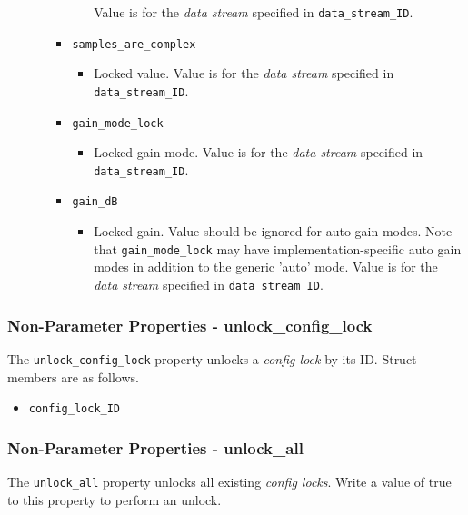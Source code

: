 \documentclass{article}
\begin{document}
\begin{itemize}
\begin{itemize}
\begin{itemize}
\begin{itemize}
                  Value is for the \textit{data stream} specified in
                  \verb+data_stream_ID+.
              \end{itemize}
            \item \verb+samples_are_complex+
              \begin{itemize}
                \item Locked value.
                  Value is for the \textit{data stream} specified in
                  \verb+data_stream_ID+.
              \end{itemize}
            \item \verb+gain_mode_lock+
              \begin{itemize}
                \item Locked gain mode.
                  Value is for the \textit{data stream} specified in
                  \verb+data_stream_ID+.
              \end{itemize}
            \item \verb+gain_dB+
              \begin{itemize}
                \item Locked gain. Value should be ignored for auto gain modes.
                  Note that \verb+gain_mode_lock+ may have implementation-specific
                  auto gain modes in addition to the generic 'auto' mode.
                  Value is for the \textit{data stream} specified in
                  \verb+data_stream_ID+.
              \end{itemize}
          \end{itemize}

      \end{itemize}

  \end{itemize}

  \subsubsection{Non-Parameter Properties - unlock\_config\_lock}
  The \verb+unlock_config_lock+ property unlocks a \textit{config lock} by its
  ID. Struct
  members are as follows.
  \begin{itemize}
    \item \verb+config_lock_ID+
  \end{itemize}

  \subsubsection{Non-Parameter Properties - unlock\_all}
  The \verb+unlock_all+ property unlocks all existing \textit{config locks}.
  Write a
  value of true to this property to
  perform an unlock.
\end{document}
